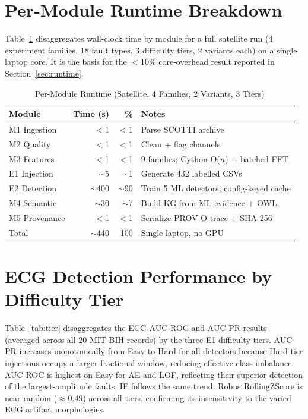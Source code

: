 \documentclass[conference]{IEEEtran}
\begin{document}

\section{Per-Module Runtime Breakdown}
\label{app:runtime}

Table~\ref{tab:runtime} disaggregates wall-clock time by module for a full satellite run (4 experiment families, 18 fault types, 3 difficulty tiers, 2 variants each) on a single laptop core. It is the basis for the $<$10\% core-overhead result reported in Section~\ref{sec:runtime}.

\begin{table}[h]
\caption{Per-Module Runtime (Satellite, 4 Families, 2 Variants, 3 Tiers)}
\label{tab:runtime}
\centering
\scriptsize
\setlength{\tabcolsep}{3.5pt}
\begin{tabular}{@{}lrrl@{}}
\toprule
\textbf{Module} & \textbf{Time (s)} & \textbf{\%} & \textbf{Notes} \\
\midrule
M1 Ingestion     & $<$1     & $<$1  & Parse SCOTTI archive \\
M2 Quality       & $<$1     & $<$1  & Clean + flag channels \\
M3 Features      & $<$1     & $<$1  & 9 families; Cython O($n$) + batched FFT \\
E1 Injection     & $\sim$5  & $\sim$1  & Generate 432 labelled CSVs \\
E2 Detection     & $\sim$400 & $\sim$90 & Train 5 ML detectors; config-keyed cache \\
M4 Semantic      & $\sim$30 & $\sim$7  & Build KG from ML evidence + OWL \\
M5 Provenance    & $<$1     & $<$1  & Serialize PROV-O trace + SHA-256 \\
\midrule
Total            & $\sim$440 & 100  & Single laptop, no GPU \\
\bottomrule
\end{tabular}
\end{table}


\section{ECG Detection Performance by Difficulty Tier}
\label{app:tier}

Table~\ref{tab:tier} disaggregates the ECG AUC-ROC and AUC-PR results (averaged across all 20 MIT-BIH records) by the three E1 difficulty tiers. AUC-PR increases monotonically from Easy to Hard for all detectors because Hard-tier injections occupy a larger fractional window, reducing effective class imbalance. AUC-ROC is highest on Easy for AE and LOF, reflecting their superior detection of the largest-amplitude faults; IF follows the same trend. RobustRollingZScore is near-random ($\approx\!0.49$) across all tiers, confirming its insensitivity to the varied ECG artifact morphologies.
\end{document}
